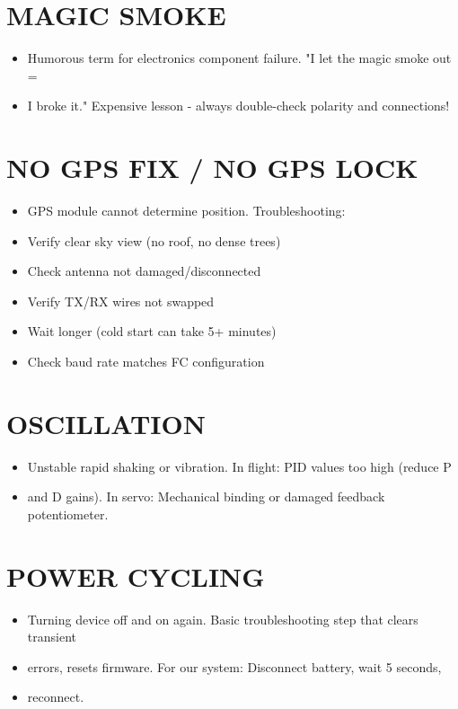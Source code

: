 \documentclass[11pt,letterpaper]{article}
\begin{document}
\section{MAGIC SMOKE}

\begin{itemize}
  \item Humorous term for electronics component failure. "I let the magic smoke out =
  \item I broke it." Expensive lesson - always double-check polarity and connections!
\end{itemize}

\section{NO GPS FIX / NO GPS LOCK}

\begin{itemize}
  \item GPS module cannot determine position. Troubleshooting:
  \item Verify clear sky view (no roof, no dense trees)
  \item Check antenna not damaged/disconnected
  \item Verify TX/RX wires not swapped
  \item Wait longer (cold start can take 5+ minutes)
  \item Check baud rate matches FC configuration
\end{itemize}

\section{OSCILLATION}

\begin{itemize}
  \item Unstable rapid shaking or vibration. In flight: PID values too high (reduce P
  \item and D gains). In servo: Mechanical binding or damaged feedback potentiometer.
\end{itemize}

\section{POWER CYCLING}

\begin{itemize}
  \item Turning device off and on again. Basic troubleshooting step that clears transient
  \item errors, resets firmware. For our system: Disconnect battery, wait 5 seconds,
  \item reconnect.
\end{itemize}
\end{document}
